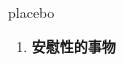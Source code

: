 
\begin{frame}
{\huge placebo}
\begin{center}
\begin{enumerate}\Large
  \item \textbf{安慰性的事物}
\end{enumerate}
\end{center}
\end{frame}
